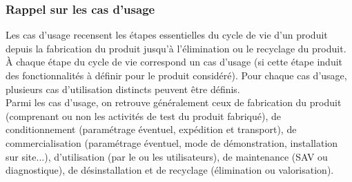 \subsubsection{Rappel sur les cas d'usage}
Les cas d'usage recensent les étapes essentielles du cycle de vie d'un produit depuis la fabrication du produit jusqu'à l'élimination ou le recyclage du produit. \`A chaque étape du cycle de vie correspond un cas d'usage (si cette étape induit des fonctionnalités à définir pour le produit considéré). Pour chaque cas d'usage, plusieurs cas d'utilisation distincts peuvent être définis.\\
\newline
Parmi les cas d'usage, on retrouve généralement ceux de fabrication du produit (comprenant ou non les activités de test du produit fabriqué), de conditionnement (paramétrage éventuel, expédition et transport), de commercialisation (paramétrage éventuel, mode de démonstration, installation sur site...), d'utilisation (par le ou les utilisateurs), de maintenance (SAV ou diagnostique), de désinstallation et de recyclage (élimination ou valorisation).
\medskip
